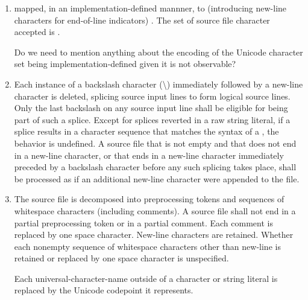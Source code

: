 \documentclass{wg21}
\begin{document}
\begin{enumerate}
\item
{}%
 mapped, in an implementation-defined mannner,
to  (introducing new-line characters for end-of-line
indicators) .
The set of  source file character accepted is .


\begin{quoteblock}
Do we need to mention anything about the encoding of the Unicode character set being implementation-defined given it is not observable?
\end{quoteblock}

\item
{}%
Each instance of a backslash character (\textbackslash)
immediately followed by a new-line character is deleted, splicing
 source input lines to form logical source lines. Only the last
backslash on any  source input line shall be eligible for being part
of such a splice.
Except for splices reverted in a raw string literal, if a splice results in
a character sequence that matches the
syntax of a , the behavior is
undefined. A source file that is not empty and that does not end in a new-line
character, or that ends in a new-line character immediately preceded by a
backslash character before any such splicing takes place,
shall be processed as if an additional new-line character were appended
to the file.

\item The source file is decomposed into preprocessing
tokens and sequences of whitespace characters
(including comments). A source file shall not end in a partial
preprocessing token or in a partial comment.
Each comment is replaced by one space character. New-line characters are
retained. Whether each nonempty sequence of whitespace characters other
than new-line is retained or replaced by one space character is
unspecified.
\begin{addedblock}
Each universal-character-name outside of a character or string literal is replaced by the Unicode codepoint it represents.
\end{addedblock}


\end{enumerate}
\end{document}
